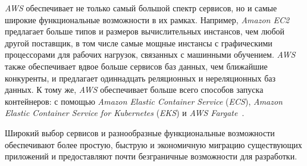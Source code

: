\textit{AWS} обеспечивает не только самый большой спектр сервисов, но и самые широкие функциональные возможности в их рамках. Например, \textit{Amazon EC2} предлагает больше типов и размеров вычислительных инстансов, чем любой другой поставщик, в том числе самые мощные инстансы с графическими процессорами для рабочих нагрузок, связанных с машинными обучением. \textit{AWS} также обеспечивает вдвое больше сервисов баз данных, чем ближайшие конкуренты, и предлагает одиннадцать реляционных и нереляционных баз данных. К тому же, \textit{AWS} обеспечивает больше всего способов запуска контейнеров: с помощью \textit{Amazon Elastic Container Service} (\textit{ECS}), \textit{Amazon Elastic Container Service for Kubernetes} (\textit{EKS}) и \textit{AWS Fargate}~\cite{aws}.

Широкий выбор сервисов и разнообразные функциональные возможности обеспечивают более простую, быструю и экономичную миграцию существующих приложений и предоставляют почти безграничные возможности для разработки.


